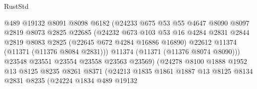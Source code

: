 \begin{lexlean}{RustStd}
\begin{coremodule}
                                  @489
                                  @19132
                                  @8091
                                  @8098
                                  @6182
                                  (@24233
                                    @675
                                    @53
                                    @55
                                    @4647
                                    @8090
                                    @8097
                                    @2819
                                    @8073
                                    @2825
                                    @22685
                                    (@24232
                                      @673
                                      @103
                                      @53
                                      @16
                                      @4284
                                      @2831
                                      @2844
                                      @2819
                                      @8083
                                      @2825
                                      (@22645 @672 @4284 @16886 @16890)
                                      @22612
                                      @11374
                                      (@11371 (@11376 @8084 @2831)))
                                    @11374
                                    (@11371 (@11376 @8074 @8090)))
                                  @23548
                                  @23551
                                  @23554
                                  @23558
                                  @23563
                                  @23569)
                                (@24278
                                  @8100
                                  @1888
                                  @1952
                                  @13
                                  @8125
                                  @8235
                                  @8261
                                  @8371
                                  (@24213
                                    @1835
                                    @1861
                                    @1887
                                    @13
                                    @8125
                                    @8134
                                    @2831
                                    @8235
                                    (@24224
                                      @1834
                                      @489
                                      @19132

\end{coremodule}
\end{lexlean}
